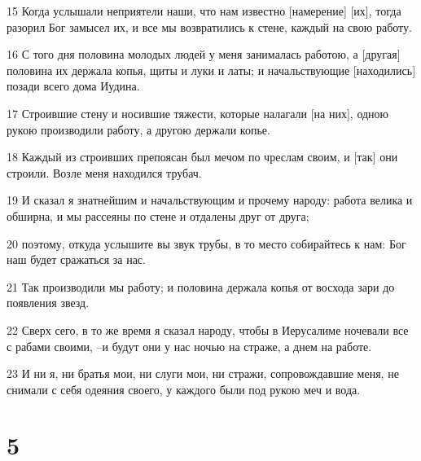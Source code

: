 \par 15 Когда услышали неприятели наши, что нам известно [намерение] [их], тогда разорил Бог замысел их, и все мы возвратились к стене, каждый на свою работу.
\par 16 С того дня половина молодых людей у меня занималась работою, а [другая] половина их держала копья, щиты и луки и латы; и начальствующие [находились] позади всего дома Иудина.
\par 17 Строившие стену и носившие тяжести, которые налагали [на них], одною рукою производили работу, а другою держали копье.
\par 18 Каждый из строивших препоясан был мечом по чреслам своим, и [так] они строили. Возле меня находился трубач.
\par 19 И сказал я знатнейшим и начальствующим и прочему народу: работа велика и обширна, и мы рассеяны по стене и отдалены друг от друга;
\par 20 поэтому, откуда услышите вы звук трубы, в то место собирайтесь к нам: Бог наш будет сражаться за нас.
\par 21 Так производили мы работу; и половина держала копья от восхода зари до появления звезд.
\par 22 Сверх сего, в то же время я сказал народу, чтобы в Иерусалиме ночевали все с рабами своими, --и будут они у нас ночью на страже, а днем на работе.
\par 23 И ни я, ни братья мои, ни слуги мои, ни стражи, сопровождавшие меня, не снимали с себя одеяния своего, у каждого были под рукою меч и вода.

\chapter{5}

